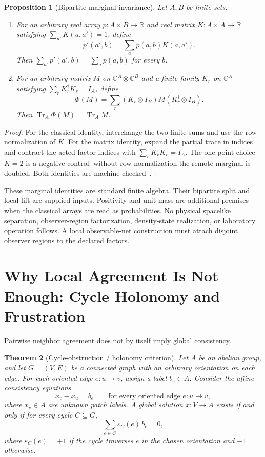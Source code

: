 \documentclass[11pt]{article}
\newtheorem{theorem}{Theorem}[section]
\newtheorem{proposition}[theorem]{Proposition}
\theoremstyle{remark}
\theoremstyle{plain}
\begin{document}
\begin{proposition}[Bipartite marginal invariance]
\label{prop:bipartite-marginal-invariance}
Let \(A,B\) be finite sets.
\begin{enumerate}[label=(\roman*),leftmargin=2em]
\item For an arbitrary real array \(p:A\times B\to\mathbb R\) and real matrix
\(K:A\times A\to\mathbb R\) satisfying
\(\sum_{a'}K(a,a')=1\), define
\[
  p'(a',b)=\sum_a p(a,b)K(a,a').
\]
Then \(\sum_{a'}p'(a',b)=\sum_a p(a,b)\) for every \(b\).
\item For an arbitrary matrix \(M\) on
\(\mathbb C^A\otimes\mathbb C^B\) and a finite family \(K_r\) on
\(\mathbb C^A\) satisfying \(\sum_rK_r^\dagger K_r=I_A\), define
\[
  \Phi(M)=\sum_r(K_r\otimes I_B)M(K_r^\dagger\otimes I_B).
\]
Then \(\operatorname{Tr}_A\Phi(M)=\operatorname{Tr}_A M\).
\end{enumerate}
\end{proposition}

\begin{proof}
For the classical identity, interchange the two finite sums and use the row
normalization of \(K\).  For the matrix identity, expand the partial trace in
indices and contract the acted-factor indices with
\(\sum_rK_r^\dagger K_r=I_A\).  The one-point choice \(K=2\) is a negative
control: without row normalization the remote marginal is doubled.  Both
identities are machine checked~\cite{ophrepo}.
\end{proof}

These marginal identities are standard finite algebra.  Their bipartite split
and local lift are supplied inputs.  Positivity and unit mass are additional
premises when the classical arrays are read as probabilities.  No physical
spacelike separation, observer-region factorization, density-state
realization, or laboratory operation follows.  A local observable-net
construction must attach disjoint observer regions to the declared factors.

\section{Why Local Agreement Is Not Enough: Cycle Holonomy and Frustration}

Pairwise neighbor agreement does not by itself imply global consistency.

\begin{theorem}[Cycle-obstruction / holonomy criterion]\label{thm:holonomy}
Let $A$ be an abelian group, and let $G=(V,E)$ be a connected graph with an arbitrary orientation on each edge. For each oriented edge $e:u\to v$, assign a label $b_e\in A$. Consider the affine consistency equations
\[
x_v - x_u = b_e
\qquad
\text{for every oriented edge } e:u\to v,
\]
where $x_v\in A$ are unknown patch labels. A global solution $x:V\to A$ exists if and only if for every cycle $C\subseteq G$,
\[
\sum_{e\in C}\varepsilon_C(e)\, b_e = 0,
\]
where $\varepsilon_C(e)=+1$ if the cycle traverses $e$ in the chosen orientation and $-1$ otherwise.
\end{theorem}
\end{document}
